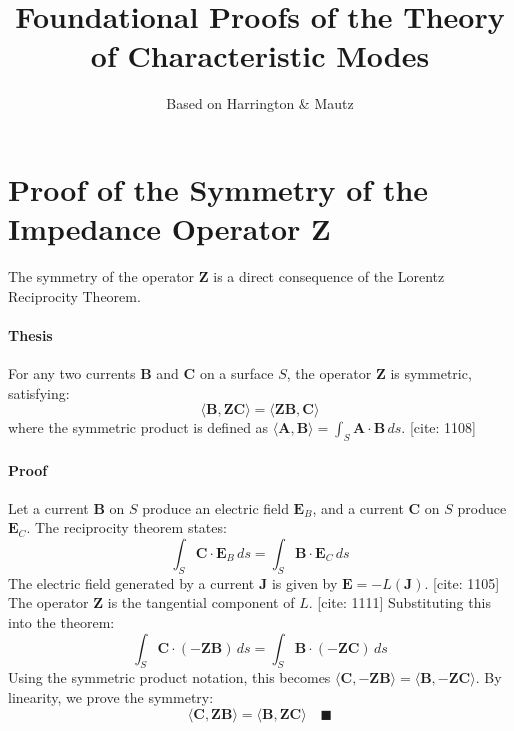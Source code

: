 \documentclass{article}
\title{Foundational Proofs of the Theory of Characteristic Modes}
\author{Based on Harrington \& Mautz}
\date{}
\begin{document}
\maketitle

\section{Proof of the Symmetry of the Impedance Operator $\mathbf{Z}$}
The symmetry of the operator $\mathbf{Z}$ is a direct consequence of the Lorentz Reciprocity Theorem. 

\paragraph{Thesis} For any two currents $\mathbf{B}$ and $\mathbf{C}$ on a surface $S$, the operator $\mathbf{Z}$ is symmetric, satisfying:
\begin{equation}
    \langle \mathbf{B}, \mathbf{Z}\mathbf{C} \rangle = \langle \mathbf{Z}\mathbf{B}, \mathbf{C} \rangle
\end{equation}
where the symmetric product is defined as $\langle \mathbf{A}, \mathbf{B} \rangle = \int_S \mathbf{A} \cdot \mathbf{B} \,ds$. [cite: 1108]

\paragraph{Proof}
Let a current $\mathbf{B}$ on $S$ produce an electric field $\mathbf{E}_B$, and a current $\mathbf{C}$ on $S$ produce $\mathbf{E}_C$. The reciprocity theorem states:
\begin{equation}
    \int_S \mathbf{C} \cdot \mathbf{E}_B \,ds = \int_S \mathbf{B} \cdot \mathbf{E}_C \,ds
\end{equation}
The electric field generated by a current $\mathbf{J}$ is given by $\mathbf{E} = -L(\mathbf{J})$. [cite: 1105] The operator $\mathbf{Z}$ is the tangential component of $L$. [cite: 1111] Substituting this into the theorem:
\begin{equation}
    \int_S \mathbf{C} \cdot (-\mathbf{Z}\mathbf{B}) \,ds = \int_S \mathbf{B} \cdot (-\mathbf{Z}\mathbf{C}) \,ds
\end{equation}
Using the symmetric product notation, this becomes $\langle \mathbf{C}, -\mathbf{Z}\mathbf{B} \rangle = \langle \mathbf{B}, -\mathbf{Z}\mathbf{C} \rangle$. By linearity, we prove the symmetry:
\begin{equation}
    \langle \mathbf{C}, \mathbf{Z}\mathbf{B} \rangle = \langle \mathbf{B}, \mathbf{Z}\mathbf{C} \rangle \quad \blacksquare
\end{equation}
\end{document}
